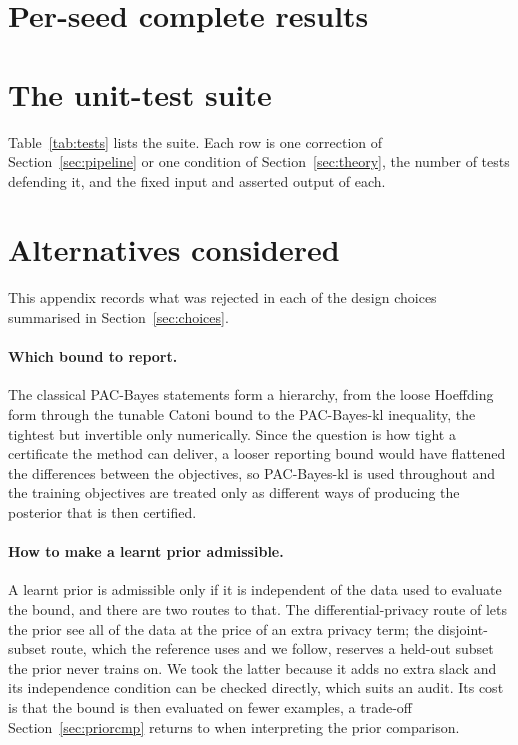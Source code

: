 \begin{uomappendix}
    \section{Per-seed complete results}\label{app:perseed}
    

    \clearpage
    \section{The unit-test suite}\label{app:tests}
    Table~\ref{tab:tests} lists the suite. Each row is one correction of
    Section~\ref{sec:pipeline} or one condition of Section~\ref{sec:theory}, the
    number of tests defending it, and the fixed input and asserted output of each.
    

    \section{Alternatives considered}\label{app:choices}
    This appendix records what was rejected in each of the design choices
    summarised in Section~\ref{sec:choices}.

    \paragraph{Which bound to report.} The classical PAC-Bayes statements form a
    hierarchy, from the loose Hoeffding form through the tunable Catoni bound to
    the PAC-Bayes-kl inequality, the tightest but invertible only numerically.
    Since the question is how tight a certificate the method can deliver, a
    looser reporting bound would have flattened the differences between the
    objectives, so PAC-Bayes-kl is used throughout and the training objectives
    are treated only as different ways of producing the posterior that is then
    certified.

    \paragraph{How to make a learnt prior admissible.} A learnt prior is
    admissible only if it is independent of the data used to evaluate the bound,
    and there are two routes to that. The differential-privacy route of
    \textcite{dziugaite2018} lets the prior see all of the data at the price of
    an extra privacy term; the disjoint-subset route, which the reference uses
    and we follow, reserves a held-out subset the prior never trains on. We took
    the latter because it adds no extra slack and its independence condition can
    be checked directly, which suits an audit. Its cost is that the bound is then
    evaluated on fewer examples, a trade-off Section~\ref{sec:priorcmp} returns
    to when interpreting the prior comparison.


\end{uomappendix}
